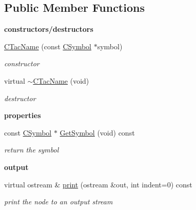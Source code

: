 \subsection*{Public Member Functions}
\begin{Indent}{\bf constructors/destructors}\par
\begin{DoxyCompactItemize}
\item 
\hyperlink{classCTacName_a87a5edde2616b4cb41492efdfec63391}{C\-Tac\-Name} (const \hyperlink{classCSymbol}{C\-Symbol} $\ast$symbol)
\begin{DoxyCompactList}\small\item\em constructor \end{DoxyCompactList}\item 
\hypertarget{classCTacName_ae6cd953d1cf7b780aa732c359353c997}{virtual \hyperlink{classCTacName_ae6cd953d1cf7b780aa732c359353c997}{$\sim$\-C\-Tac\-Name} (void)}\label{classCTacName_ae6cd953d1cf7b780aa732c359353c997}

\begin{DoxyCompactList}\small\item\em destructor \end{DoxyCompactList}\end{DoxyCompactItemize}
\end{Indent}
\begin{Indent}{\bf properties}\par
\begin{DoxyCompactItemize}
\item 
\hypertarget{classCTacName_a849dcaa88c78a11e020b8d959ab9d072}{const \hyperlink{classCSymbol}{C\-Symbol} $\ast$ \hyperlink{classCTacName_a849dcaa88c78a11e020b8d959ab9d072}{Get\-Symbol} (void) const }\label{classCTacName_a849dcaa88c78a11e020b8d959ab9d072}

\begin{DoxyCompactList}\small\item\em return the symbol \end{DoxyCompactList}\end{DoxyCompactItemize}
\end{Indent}
\begin{Indent}{\bf output}\par
\begin{DoxyCompactItemize}
\item 
virtual ostream \& \hyperlink{classCTacName_a231272d4d4785d0d4f347e6d5aa10efe}{print} (ostream \&out, int indent=0) const 
\begin{DoxyCompactList}\small\item\em print the node to an output stream \end{DoxyCompactList}\end{DoxyCompactItemize}
\end{Indent}
